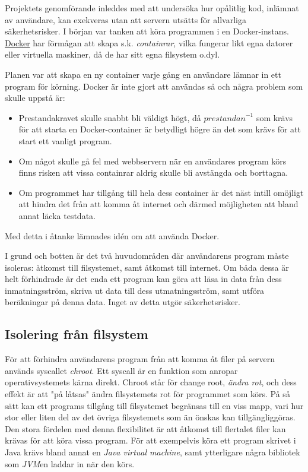 \documentclass{article}
\begin{document}
Projektets genomförande inleddes med att undersöka hur opålitlig kod, inlämnat
av användare, kan exekveras utan att servern utsätts för allvarliga
säkerhetsrisker. I början var tanken att köra programmen i en Docker-instans.
\href{https://www.docker.com}{Docker} har förmågan att skapa s.k.
\textit{containrar}, vilka fungerar likt egna datorer eller virtuella maskiner,
då de har sitt egna filsystem o.dyl.

Planen var att skapa en ny container varje gång en användare lämnar in ett
program för körning. Docker är inte gjort att användas så och några problem som
skulle uppstå är:
\begin{itemize}
	\item Prestandakravet skulle snabbt bli väldigt högt, då ${prestandan}^{-1}$
		som krävs för att starta en Docker-container är betydligt högre än det
		som krävs för att start ett vanligt program.
	\item Om något skulle gå fel med webbservern när en användares program körs
		finns risken att vissa containrar aldrig skulle bli avstängda och
		borttagna.
	\item Om programmet har tillgång till hela dess container är det näst
		intill omöjligt att hindra det från att komma åt internet och därmed
		möjligheten att bland annat läcka testdata.
\end{itemize}
Med detta i åtanke lämnades idén om att använda Docker.

I grund och botten är det två huvudområden där användarens program måste
isoleras: åtkomst till filsystemet, samt åtkomst till internet. Om båda dessa är
helt förhindrade är det enda ett program kan göra att läsa in data från dess
inmatningsström, skriva ut data till dess utmatningsström, samt utföra
beräkningar på denna data. Inget av detta utgör säkerhetsrisker.

\subsection{Isolering från filsystem}

För att förhindra användarens program från att komma åt filer på servern används
syscallet \textit{chroot}. Ett syscall är en funktion som anropar
operativsystemets kärna direkt. Chroot står för change root,
\textit{ändra rot}, och dess effekt är att "på låtsas" ändra filsystemets rot
för programmet som körs. På så sätt kan ett programs tillgång till filsystemet
begränsas till en viss mapp, vari hur stor eller liten del av det övriga
filsystemets som än önskas kan tillgängliggöras. Den stora fördelen med denna
flexibilitet är att åtkomst till flertalet filer kan krävas för att köra vissa
program. För att exempelvis köra ett program skrivet i Java krävs bland annat en
\textit{Java virtual machine}, samt ytterligare några bibliotek som
\textit{JVM}en laddar in när den körs.
\end{document}

